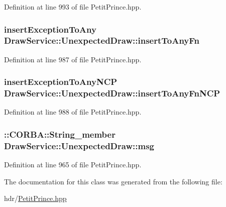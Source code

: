 Definition at line 993 of file Petit\+Prince.\+hpp.

\subsubsection[{\texorpdfstring{insert\+To\+Any\+Fn}{insertToAnyFn}}]{ insert\+Exception\+To\+Any Draw\+Service\+::\+Unexpected\+Draw\+::insert\+To\+Any\+Fn\hspace{0.3cm}{\ttfamily [static]}}\hypertarget{class_draw_service_1_1_unexpected_draw_ac6b1f9d4c18d5348448cc060dfa40b2c}{}\label{class_draw_service_1_1_unexpected_draw_ac6b1f9d4c18d5348448cc060dfa40b2c}


Definition at line 987 of file Petit\+Prince.\+hpp.

\subsubsection[{\texorpdfstring{insert\+To\+Any\+Fn\+N\+CP}{insertToAnyFnNCP}}]{ insert\+Exception\+To\+Any\+N\+CP Draw\+Service\+::\+Unexpected\+Draw\+::insert\+To\+Any\+Fn\+N\+CP\hspace{0.3cm}{\ttfamily [static]}}\hypertarget{class_draw_service_1_1_unexpected_draw_ad2cb451677a167ec2cf37ad5a4527831}{}\label{class_draw_service_1_1_unexpected_draw_ad2cb451677a167ec2cf37ad5a4527831}


Definition at line 988 of file Petit\+Prince.\+hpp.

\subsubsection[{\texorpdfstring{msg}{msg}}]{\setlength{\rightskip}{0pt plus 5cm}\+::C\+O\+R\+B\+A\+::\+String\+\_\+member Draw\+Service\+::\+Unexpected\+Draw\+::msg}\hypertarget{class_draw_service_1_1_unexpected_draw_a50b800e0cd7cf856795cef5bc7f3559e}{}\label{class_draw_service_1_1_unexpected_draw_a50b800e0cd7cf856795cef5bc7f3559e}


Definition at line 965 of file Petit\+Prince.\+hpp.



The documentation for this class was generated from the following file\+:\begin{DoxyCompactItemize}
\item 
hdr/\hyperlink{_petit_prince_8hpp}{Petit\+Prince.\+hpp}\end{DoxyCompactItemize}

